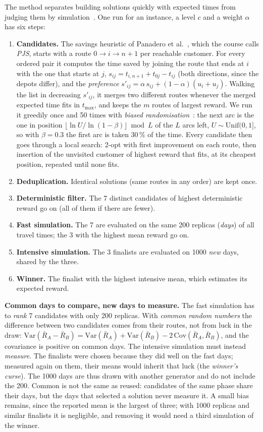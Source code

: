 \documentclass[10pt,a4paper]{article}
\begin{document}
The method separates building solutions quickly with expected times from judging them by
simulation~\cite{juan2019}. One run for an instance, a level $c$ and a weight $\alpha$ has six steps:
\begin{enumerate}
\item \textbf{Candidates.} The savings heuristic of Panadero et al.~\cite{panadero2021}, which the course calls \emph{PJS}, starts with
a route $0\to i\to n+1$ per reachable customer. For every ordered pair it computes the time saved by
joining the route that ends at $i$ with the one that starts at $j$, $s_{ij}=t_{i,n+1}+t_{0j}-t_{ij}$
(both directions, since the depots differ), and the \emph{preference}
$s'_{ij}=\alpha\,s_{ij}+(1-\alpha)(u_i+u_j)$. Walking the list in decreasing $s'_{ij}$, it merges two
different routes whenever the merged expected time fits in $t_{\max}$, and keeps the $m$ routes of
largest reward. We run it greedily once and 50 times with \emph{biased randomisation}~\cite{grasas2017}:
the next arc is the one in position $\lfloor\ln U/\ln(1-\beta)\rfloor \bmod L$ of the $L$ arcs left,
$U\sim\text{Unif}(0,1]$, so with $\beta=0.3$ the first arc is taken 30\,\% of the time. Every candidate
then goes through a local search: 2-opt with first improvement on each route, then insertion of the
unvisited customer of highest reward that fits, at its cheapest position, repeated until none fits.
\item \textbf{Deduplication.} Identical solutions (same routes in any order) are kept once.
\item \textbf{Deterministic filter.} The 7 distinct candidates of highest deterministic reward go on
(all of them if there are fewer).
\item \textbf{Fast simulation.} The 7 are evaluated on the same 200 replicas (\emph{days}) of all travel
times; the 3 with the highest mean reward go on.
\item \textbf{Intensive simulation.} The 3 finalists are evaluated on 1000 \emph{new} days, shared by the
three.
\item \textbf{Winner.} The finalist with the highest intensive mean, which estimates its expected reward.
\end{enumerate}

\textbf{Common days to compare, new days to measure.} The fast simulation has to \emph{rank} 7
candidates with only 200 replicas. With \emph{common random numbers} the difference between two
candidates comes from their routes, not from luck in the draw:
$\text{Var}(\bar R_A-\bar R_B)=\text{Var}(\bar R_A)+\text{Var}(\bar R_B)-2\,\text{Cov}(\bar R_A,\bar R_B)$,
and the covariance is positive on common days. The intensive simulation must instead \emph{measure}.
The finalists were chosen because they did well on the fast days; measured again on them, their means
would inherit that luck (the \emph{winner's curse}). The 1000 days are thus drawn with another generator
and do not include the 200. Common is not the same as reused: candidates of the same phase share their
days, but the days that selected a solution never measure it. A small bias remains, since the reported
mean is the largest of three; with 1000 replicas and similar finalists it is negligible, and removing it
would need a third simulation of the winner.
\end{document}
